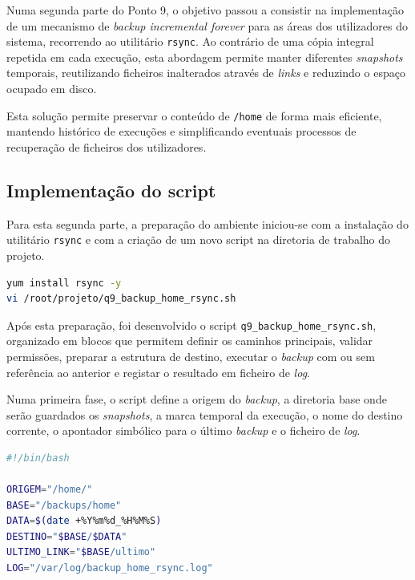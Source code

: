 Numa segunda parte do Ponto 9, o objetivo passou a consistir na implementa\c{c}\~ao de um mecanismo de \textit{backup incremental forever} para as \'{a}reas dos utilizadores do sistema, recorrendo ao utilit\'ario \texttt{rsync}. Ao contr\'ario de uma c\'opia integral repetida em cada execu\c{c}\~ao, esta abordagem permite manter diferentes \textit{snapshots} temporais, reutilizando ficheiros inalterados atrav\'es de \textit{links} e reduzindo o espa\c{c}o ocupado em disco.

Esta solu\c{c}\~ao permite preservar o conte\'udo de \texttt{/home} de forma mais eficiente, mantendo hist\'orico de execu\c{c}\~oes e simplificando eventuais processos de recupera\c{c}\~ao de ficheiros dos utilizadores.

\subsection{Implementa\c{c}\~ao do script}

Para esta segunda parte, a prepara\c{c}\~ao do ambiente iniciou-se com a instala\c{c}\~ao do utilit\'ario \texttt{rsync} e com a cria\c{c}\~ao de um novo script na diretoria de trabalho do projeto.

\begin{lstlisting}[language=bash,caption={Preparacao inicial da segunda parte da Questao 9}]
yum install rsync -y
vi /root/projeto/q9_backup_home_rsync.sh
\end{lstlisting}

Ap\'os esta prepara\c{c}\~ao, foi desenvolvido o script \texttt{q9\_backup\_home\_rsync.sh}, organizado em blocos que permitem definir os caminhos principais, validar permiss\~oes, preparar a estrutura de destino, executar o \textit{backup} com ou sem refer\^encia ao anterior e registar o resultado em ficheiro de \textit{log}.

Numa primeira fase, o script define a origem do \textit{backup}, a diretoria base onde ser\~ao guardados os \textit{snapshots}, a marca temporal da execu\c{c}\~ao, o nome do destino corrente, o apontador simb\'olico para o \'{u}ltimo \textit{backup} e o ficheiro de \textit{log}.

\begin{lstlisting}[language=bash,caption={Definicoes iniciais do script rsync}]
#!/bin/bash

ORIGEM="/home/"
BASE="/backups/home"
DATA=$(date +%Y%m%d_%H%M%S)
DESTINO="$BASE/$DATA"
ULTIMO_LINK="$BASE/ultimo"
LOG="/var/log/backup_home_rsync.log"
\end{lstlisting}


